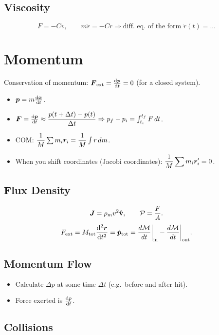 \subsection{Viscosity}
\[
    F = -Cv, \qquad m\ddot{r} = -C\dot{r} \Rightarrow \text{diff. eq. of the form } \dot{r}(t) = \ldots
\]

\section{Momentum}

Conservation of momentum: $\vect{F}_{\text{ext}} = \dv{\lvect{p}}{t} = 0$ (for a closed system).

\begin{itemize}
    \item $\bm{p} = m\dv{\bm{x}}{t}$.
    \item $\vect{F} = \dv{\lvect{p}}{t} \approx \dfrac{p(t+\Delta t) - p(t)}{\Delta t} \Rightarrow p_f - p_i = \int_{t_i}^{t_f} F\,dt$.
    \item COM: $\dfrac{1}{M}\sum m_i \bm{r}_i = \dfrac{1}{M}\int r\,dm$.
    \item When you shift coordinates (Jacobi coordinates): $\displaystyle\frac{1}{M}\sum m_i \bm{r}_i' = 0$.
\end{itemize}

\subsection{Flux Density}
\[
    \vect{J} = \rho_m v^2 \uvect{v}, \qquad \mathcal{P} = \frac{F}{A}.
\]
\[
    F_{\text{ext}} = M_{\text{tot}}\dv[2]{\bm{r}}{t} = \dot{\bm{p}}_{\text{tot}} = \frac{d\mathcal{M}}{dt}\bigg|_{\text{in}} - \frac{d\mathcal{M}}{dt}\bigg|_{\text{out}}.
\]

\subsection{Momentum Flow}
\begin{itemize}
    \item Calculate $\Delta p$ at some time $\Delta t$ (e.g.\ before and after hit).
    \item Force exerted is $\dv{p}{t}$.
\end{itemize}

\subsection{Collisions}

